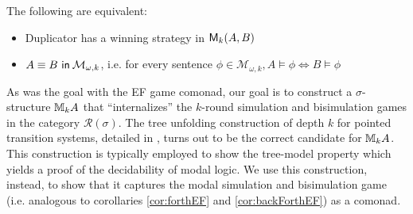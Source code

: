 \begin{prop}
The following are equivalent:
\begin{itemize}
\item Duplicator has a winning strategy in ${\mathsf{M}_{k}(A,B)}$
\item ${A \equiv B \ \mathsf{in}\: \mathcal{M}_{\omega,k}}$, i.e. for every sentence $\phi \in \mathcal{M}_{\omega,k}, A \vDash \phi \Leftrightarrow B \vDash \phi$
\end{itemize}
\end{prop}
As was the goal with the EF game comonad, our goal is to construct a $\sigma$-structure ${\mathbb{M}_{k}A}$ that ``internalizes'' the $k$-round simulation and bisimulation games in the category $\mathcal{R}(\sigma)$. The tree unfolding construction of depth $k$ for pointed transition systems, detailed in \cite{Gradel2014}, turns out to be the correct candidate for ${\mathbb{M}_{k}A}$. This construction is typically employed to show the tree-model property which yields a proof of the decidability of modal logic. We use this construction, instead, to show that it captures the modal simulation and bisimulation game (i.e. analogous to corollaries \ref{cor:forthEF} and \ref{cor:backForthEF}) as a comonad.
